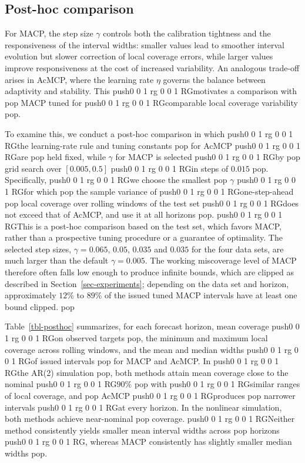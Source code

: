 \documentclass[
  american,
  12pt]{article}
\theoremstyle{plain}
\theoremstyle{plain}
\theoremstyle{remark}
\newcommand{\CPTSadd}[1]{\ifmmode\else\leavevmode\fi\pdfcolorstack 0 push{0 0 1 rg 0 0 1 RG}#1\pdfcolorstack 0 pop}
\begin{document}
\subsection{Post-hoc comparison}\label{post-hoc-comparison}

For MACP, the step size \(\gamma\) controls both the calibration
tightness and the responsiveness of the interval widths: smaller values
lead to smoother interval evolution but slower correction of local
coverage errors, while larger values improve responsiveness at the cost
of increased variability. An analogous trade-off arises in AcMCP, where
the learning rate \(\eta\) governs the balance between adaptivity and
stability. This \CPTSadd{motivates a comparison with} MACP tuned for \CPTSadd{comparable
local coverage variability}.

To examine this, we conduct a post-hoc comparison in which \CPTSadd{the
learning-rate rule and tuning constants} for AcMCP \CPTSadd{are} held fixed, while
\(\gamma\) for MACP is selected \CPTSadd{by} grid search over \([0.005, 0.5]\) \CPTSadd{in
steps of \(0.015\)}. Specifically, \CPTSadd{we choose the smallest} \(\gamma\) \CPTSadd{for
which} the sample variance of \CPTSadd{one-step-ahead} local coverage over rolling
windows of the test set \CPTSadd{does not exceed that of AcMCP, and use it at all
horizons}. \CPTSadd{This is a post-hoc comparison based on the test set, which
favors MACP, rather than a prospective tuning procedure or a guarantee
of optimality. The selected step sizes, \(\gamma=0.065\), \(0.05\),
\(0.035\) and \(0.035\) for the four data sets, are much larger than the
default \(\gamma=0.005\). The working miscoverage level of MACP
therefore often falls low enough to produce infinite bounds, which are
clipped as described in Section~\ref{sec-experiments}; depending on the
data set and horizon, approximately \(12\%\) to \(89\%\) of the issued
tuned MACP intervals have at least one bound clipped.}

Table~\ref{tbl-posthoc} summarizes, for each forecast horizon, mean
coverage \CPTSadd{on observed targets}, the minimum and maximum local coverage
across rolling windows, and the mean and median widths \CPTSadd{of issued
intervals} for MACP and AcMCP. In \CPTSadd{the AR(2) simulation}, both methods
attain mean coverage close to the nominal \CPTSadd{\(90\%\)} with \CPTSadd{similar ranges
of local coverage, and} AcMCP \CPTSadd{produces} narrower intervals \CPTSadd{at every
horizon. In the nonlinear simulation, both methods achieve near-nominal}
coverage. \CPTSadd{Neither method consistently yields smaller mean interval
widths across} horizons\CPTSadd{, whereas MACP consistently has slightly smaller
median widths}.
\end{document}
